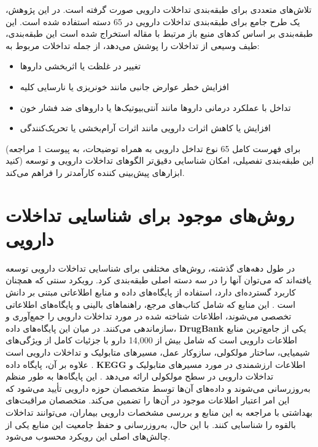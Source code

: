 تلاش‌های متعددی برای طبقه‌بندی تداخلات دارویی صورت گرفته است. در این پژوهش، یک طرح جامع برای طبقه‌بندی تداخلات دارویی در 65 دسته استفاده شده است. این طبقه‌بندی بر اساس کدهای منبع باز مرتبط با مقاله \cite{ref_ryu2018} استخراج شده است این طبقه‌بندی، طیف وسیعی از تداخلات را پوشش می‌دهد، از جمله تداخلات مربوط به:

\begin{itemize}
	\item تغییر در غلظت یا اثربخشی داروها
	\item افزایش خطر عوارض جانبی مانند خونریزی یا نارسایی کلیه
	\item تداخل با عملکرد درمانی داروها مانند آنتی‌بیوتیک‌ها یا داروهای ضد فشار خون
	\item افزایش یا کاهش اثرات دارویی مانند اثرات آرام‌بخشی یا تحریک‌کنندگی
\end{itemize}

(برای فهرست کامل 65 نوع تداخل دارویی به همراه توضیحات، به پیوست 1 مراجعه کنید)
این طبقه‌بندی تفصیلی، امکان شناسایی دقیق‌تر الگوهای تداخلات دارویی و توسعه ابزارهای پیش‌بینی کننده کارآمدتر را فراهم می‌کند.

\section{روش‌های موجود برای شناسایی تداخلات دارویی}

در طول دهه‌های گذشته، روش‌های مختلفی برای شناسایی تداخلات دارویی توسعه یافته‌اند که می‌توان آنها را در سه دسته اصلی طبقه‌بندی کرد. رویکرد سنتی که همچنان کاربرد گسترده‌ای دارد، استفاده از پایگاه‌های داده و منابع اطلاعاتی مبتنی بر دانش است \cite{ref_ryu2018}. این منابع که شامل کتاب‌های مرجع، راهنماهای بالینی و پایگاه‌های اطلاعاتی تخصصی می‌شوند، اطلاعات شناخته شده در مورد تداخلات دارویی را جمع‌آوری و سازماندهی می‌کنند. در میان این پایگاه‌های داده، \textbf{DrugBank} یکی از جامع‌ترین منابع اطلاعات دارویی است که شامل بیش از 14,000 دارو با جزئیات کامل از ویژگی‌های شیمیایی، ساختار مولکولی، سازوکار عمل، مسیرهای متابولیک و تداخلات دارویی است \cite{ref_drugbank}. علاوه بر آن، پایگاه داده \textbf{KEGG} اطلاعات ارزشمندی در مورد مسیرهای متابولیک و تداخلات دارویی در سطح مولکولی ارائه می‌دهد \cite{ref_kegg}. این پایگاه‌ها به طور منظم به‌روزرسانی می‌شوند و داده‌های آن‌ها توسط متخصصان حوزه دارویی تأیید می‌شود که این امر اعتبار اطلاعات موجود در آن‌ها را تضمین می‌کند. متخصصان مراقبت‌های بهداشتی با مراجعه به این منابع و بررسی مشخصات دارویی بیماران، می‌توانند تداخلات بالقوه را شناسایی کنند. با این حال، به‌روزرسانی و حفظ جامعیت این منابع یکی از چالش‌های اصلی این رویکرد محسوب می‌شود.


